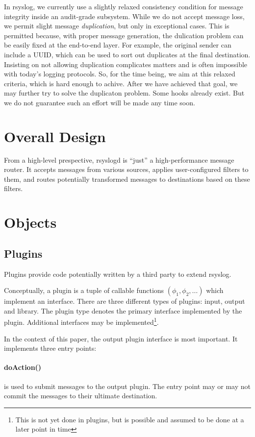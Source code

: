 \documentclass[a4paper,10pt]{article}
\begin{document}
In rsyslog, we currently use a slightly relaxed consistency condition for message integrity inside an audit-grade subsystem. While we do not accept message loss, we permit slight message \emph{duplication}, but only in exceptional cases. This is permitted because, with proper message generation, the dulication problem can be easily fixed at the end-to-end layer. For example, the original sender can include a UUID, which can be used to sort out duplicates at the final destination. Insisting on not allowing duplication complicates matters and is often impossible with today's logging protocols. So, for the time being, we aim at this relaxed criteria, which is hard enough to achive. After we have achieved that goal, we may further try to solve the duplicaton problem. Some hooks already exist. But we do not guarantee such an effort will be made any time soon.

\section{Overall Design}
From a high-level prespective, rsyslogd is ``just'' a high-performance message router. It accepts messages from various sources, applies user-configured filters to them, and routes potentially transformed messages to destinations based on these filters.
\section{Objects}
\subsection{Plugins}
Plugins provide code potentially written by a third party to extend rsyslog.

Conceptually, a plugin is a tuple of callable functions $(\phi_1, \phi_2, \ldots)$ which implement an interface. There are three different types of plugins: input, output and library. The plugin type denotes the primary interface implemented by the plugin. Additional interfaces may be implemented\footnote{This is not yet done in plugins, but is possible and assumed to be done at a later point in time}.

In the context of this paper, the output plugin interface is most important. It implements three entry points:

\paragraph{doAction()}
is used to submit messages to the output plugin. The entry point may or may not commit the messages to their ultimate destination.
\end{document}
